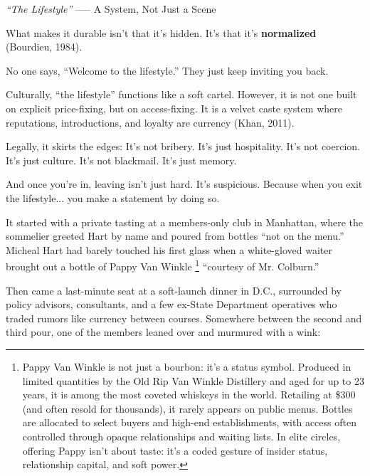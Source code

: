 \begin{HistoricalSidebar}{\textit{“The Lifestyle”} --— A System, Not Just a Scene}
  \medskip

  What makes it durable isn’t that it’s hidden.  It’s that it’s \textbf{normalized} (Bourdieu, 1984).

  \medskip

  No one says, “Welcome to the lifestyle.” They just keep inviting you back.

  \medskip

  Culturally, “the lifestyle” functions like a soft cartel. However, it is not one built on explicit price-fixing, 
  but on access-fixing. It is a velvet caste system where reputations, introductions, and loyalty are currency 
  (Khan, 2011).

  \medskip

  Legally, it skirts the edges:  
  It's not bribery. It's just hospitality.  
  It's not coercion. It's just culture.  
  It's not blackmail. It's just memory.

  \medskip

  And once you’re in, leaving isn’t just hard. It’s suspicious.  
  Because when you exit the lifestyle... you make a statement by doing so.

\end{HistoricalSidebar}


\medskip

It started with a private tasting at a members-only club in Manhattan, where the sommelier greeted Hart by name and poured 
from bottles ``not on the menu.'' Micheal Hart had barely touched his first glass when a white-gloved waiter brought out a 
bottle of Pappy Van Winkle
\footnote{Pappy Van Winkle is not just a bourbon: it's a status symbol. Produced in limited quantities by the Old Rip Van 
Winkle Distillery and aged for up to 23 years, it is among the most coveted whiskeys in the world. Retailing at \$300 
(and often resold for thousands), it rarely appears on public menus. Bottles are allocated to select buyers and high-end 
establishments, with access often controlled through opaque relationships and waiting lists. In elite circles, offering 
Pappy isn't about taste: it's a coded gesture of insider status, relationship capital, and soft power.}
 ``courtesy of Mr. Colburn.''

Then came a last-minute seat at a soft-launch dinner in D.C., surrounded by policy advisors, consultants, and a few ex-State 
Department operatives who traded rumors like currency between courses. Somewhere between the second and third pour, one of the 
members leaned over and murmured with a wink:  

